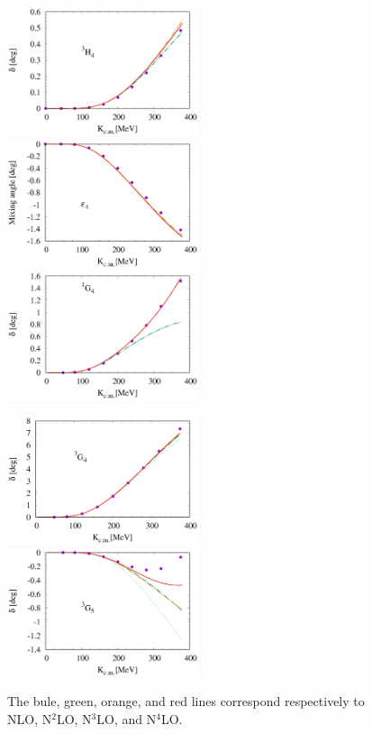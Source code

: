 \documentclass{article}
\begin{document}
\begin{figure}[htbp]
\includegraphics[width=0.5\textwidth]{7_3h4.eps}
\includegraphics[width=0.5\textwidth]{7_e4.eps}
\includegraphics[width=0.5\textwidth]{7_1g4.eps}
\end{figure}
\begin{figure}[htbp]
\includegraphics[width=0.5\textwidth]{7_3g4.eps}
\includegraphics[width=0.5\textwidth]{7_3g5.eps}
\caption{The bule, green, orange, and red lines correspond respectively to NLO, N$^2$LO, N$^3$LO, and N$^4$LO. }
\end{figure}
\end{document}

